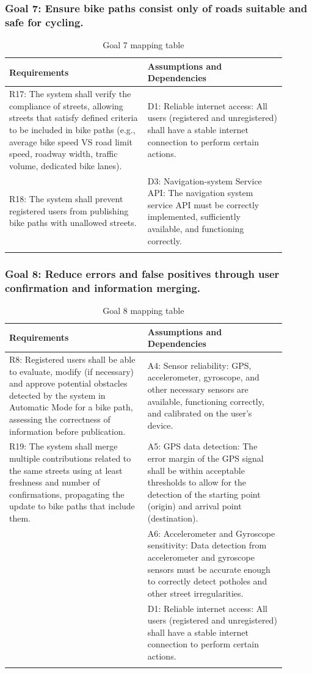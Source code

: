 \documentclass{Configuration_Files/PoliMi3i_thesis}
\begin{document}
    \subsubsection*{Goal 7: Ensure bike paths consist only of roads suitable and safe for cycling.}
    \begin{longtable}{|p{0.45\linewidth}|p{0.45\linewidth}|}
    \hline
    \textbf{Requirements} & \textbf{Assumptions and Dependencies} \\ \hline
    R17: The system shall verify the compliance of streets, allowing streets that satisfy defined criteria to be included in bike paths (e.g., average bike speed VS road limit speed, roadway width, traffic volume, dedicated bike lanes).&D1: Reliable internet access: All users (registered and unregistered) shall have a stable internet connection to perform certain actions.\\
    R18: The system shall prevent registered users from publishing bike paths with unallowed streets.&D3: Navigation-system Service API: The navigation system service API must be correctly implemented, sufficiently available, and functioning correctly.\\
    \hline
    \caption{Goal 7 mapping table}
    \end{longtable}
    
    \subsubsection*{Goal 8: Reduce errors and false positives through user confirmation and information merging.}
    \begin{longtable}{|p{0.45\linewidth}|p{0.45\linewidth}|}
    \hline
    \textbf{Requirements} & \textbf{Assumptions and Dependencies} \\ \hline
    R8: Registered users shall be able to evaluate, modify (if necessary) and approve potential obstacles detected by the system in Automatic Mode for a bike path, assessing the correctness of information before publication.&A4: Sensor reliability: GPS, accelerometer, gyroscope, and other necessary sensors are available, functioning correctly, and calibrated on the user's device.\\
    R19: The system shall merge multiple contributions related to the same streets using at least freshness and number of confirmations, propagating the update to bike paths that include them.&A5: GPS data detection: The error margin of the GPS signal shall be within acceptable thresholds to allow for the detection of the starting point (origin) and arrival point (destination).\\
    &A6: Accelerometer and Gyroscope sensitivity: Data detection from accelerometer and gyroscope sensors must be accurate enough to correctly detect potholes and other street irregularities.\\
    &D1: Reliable internet access: All users (registered and unregistered) shall have a stable internet connection to perform certain actions.\\
    \hline
    \caption{Goal 8 mapping table}
    \end{longtable}
\end{document}
